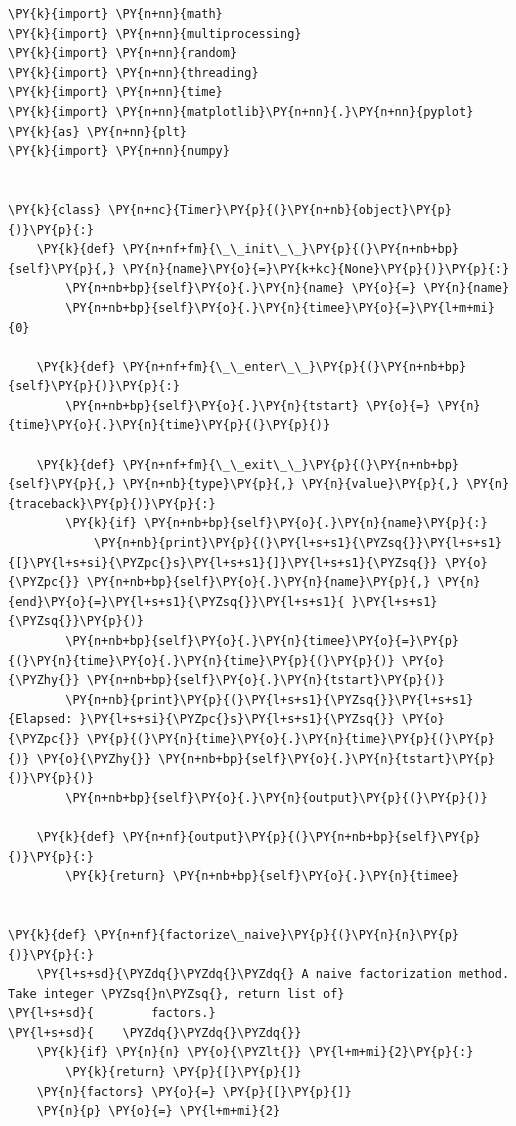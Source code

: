 \begin{Verbatim}[label=\makebox{\url{https://github.com/lucabaldini/cmepda/tree/master/slides/latex/snippets/benchmark_comparison.py}},commandchars=\\\{\}]
\PY{k}{import} \PY{n+nn}{math}
\PY{k}{import} \PY{n+nn}{multiprocessing}
\PY{k}{import} \PY{n+nn}{random}
\PY{k}{import} \PY{n+nn}{threading}
\PY{k}{import} \PY{n+nn}{time}
\PY{k}{import} \PY{n+nn}{matplotlib}\PY{n+nn}{.}\PY{n+nn}{pyplot} \PY{k}{as} \PY{n+nn}{plt}
\PY{k}{import} \PY{n+nn}{numpy}


\PY{k}{class} \PY{n+nc}{Timer}\PY{p}{(}\PY{n+nb}{object}\PY{p}{)}\PY{p}{:}
    \PY{k}{def} \PY{n+nf+fm}{\_\_init\_\_}\PY{p}{(}\PY{n+nb+bp}{self}\PY{p}{,} \PY{n}{name}\PY{o}{=}\PY{k+kc}{None}\PY{p}{)}\PY{p}{:}
        \PY{n+nb+bp}{self}\PY{o}{.}\PY{n}{name} \PY{o}{=} \PY{n}{name}
        \PY{n+nb+bp}{self}\PY{o}{.}\PY{n}{timee}\PY{o}{=}\PY{l+m+mi}{0}

    \PY{k}{def} \PY{n+nf+fm}{\_\_enter\_\_}\PY{p}{(}\PY{n+nb+bp}{self}\PY{p}{)}\PY{p}{:}
        \PY{n+nb+bp}{self}\PY{o}{.}\PY{n}{tstart} \PY{o}{=} \PY{n}{time}\PY{o}{.}\PY{n}{time}\PY{p}{(}\PY{p}{)}

    \PY{k}{def} \PY{n+nf+fm}{\_\_exit\_\_}\PY{p}{(}\PY{n+nb+bp}{self}\PY{p}{,} \PY{n+nb}{type}\PY{p}{,} \PY{n}{value}\PY{p}{,} \PY{n}{traceback}\PY{p}{)}\PY{p}{:}
        \PY{k}{if} \PY{n+nb+bp}{self}\PY{o}{.}\PY{n}{name}\PY{p}{:}
            \PY{n+nb}{print}\PY{p}{(}\PY{l+s+s1}{\PYZsq{}}\PY{l+s+s1}{[}\PY{l+s+si}{\PYZpc{}s}\PY{l+s+s1}{]}\PY{l+s+s1}{\PYZsq{}} \PY{o}{\PYZpc{}} \PY{n+nb+bp}{self}\PY{o}{.}\PY{n}{name}\PY{p}{,} \PY{n}{end}\PY{o}{=}\PY{l+s+s1}{\PYZsq{}}\PY{l+s+s1}{ }\PY{l+s+s1}{\PYZsq{}}\PY{p}{)}
        \PY{n+nb+bp}{self}\PY{o}{.}\PY{n}{timee}\PY{o}{=}\PY{p}{(}\PY{n}{time}\PY{o}{.}\PY{n}{time}\PY{p}{(}\PY{p}{)} \PY{o}{\PYZhy{}} \PY{n+nb+bp}{self}\PY{o}{.}\PY{n}{tstart}\PY{p}{)}
        \PY{n+nb}{print}\PY{p}{(}\PY{l+s+s1}{\PYZsq{}}\PY{l+s+s1}{Elapsed: }\PY{l+s+si}{\PYZpc{}s}\PY{l+s+s1}{\PYZsq{}} \PY{o}{\PYZpc{}} \PY{p}{(}\PY{n}{time}\PY{o}{.}\PY{n}{time}\PY{p}{(}\PY{p}{)} \PY{o}{\PYZhy{}} \PY{n+nb+bp}{self}\PY{o}{.}\PY{n}{tstart}\PY{p}{)}\PY{p}{)}
        \PY{n+nb+bp}{self}\PY{o}{.}\PY{n}{output}\PY{p}{(}\PY{p}{)}

    \PY{k}{def} \PY{n+nf}{output}\PY{p}{(}\PY{n+nb+bp}{self}\PY{p}{)}\PY{p}{:}
        \PY{k}{return} \PY{n+nb+bp}{self}\PY{o}{.}\PY{n}{timee}


\PY{k}{def} \PY{n+nf}{factorize\_naive}\PY{p}{(}\PY{n}{n}\PY{p}{)}\PY{p}{:}
    \PY{l+s+sd}{\PYZdq{}\PYZdq{}\PYZdq{} A naive factorization method. Take integer \PYZsq{}n\PYZsq{}, return list of}
\PY{l+s+sd}{        factors.}
\PY{l+s+sd}{    \PYZdq{}\PYZdq{}\PYZdq{}}
    \PY{k}{if} \PY{n}{n} \PY{o}{\PYZlt{}} \PY{l+m+mi}{2}\PY{p}{:}
        \PY{k}{return} \PY{p}{[}\PY{p}{]}
    \PY{n}{factors} \PY{o}{=} \PY{p}{[}\PY{p}{]}
    \PY{n}{p} \PY{o}{=} \PY{l+m+mi}{2}


\end{Verbatim}
